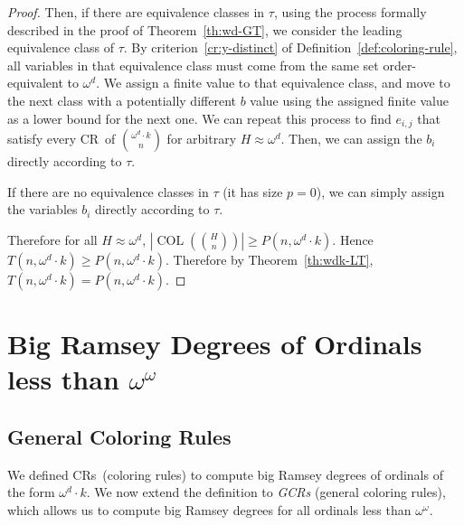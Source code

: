 \documentclass[10pt,a4paper]{article}
\newcommand{\om}{\omega}
\newcommand{\oequiv}{\approx}
\newcommand{\COL}{\operatorname{COL}}
\newcommand{\crulenospace}{CR}
\newcommand{\crulesLong}{coloring rules}
\newcommand{\crule}{\crulenospace~}
\newcommand{\crules}{\crulenospace s~}
\newcommand{\capgencrules}{General Coloring Rules}
\newcommand{\gencrulenospace}{GCR}
\newcommand{\gencrulesLong}{general coloring rules}
\newcommand{\gencrulesnospace}{\gencrulenospace s}
\newcommand{\numpoints}{n}
\newcommand{\inumpoints}{i}
\newcommand{\idegr}{j}
\newcommand{\rareconst}{b}
\theoremstyle{plain}
\theoremstyle{definition}
\begin{document}
\begin{proof}
Then, if there are equivalence classes in $\tau$, using the process formally described in the proof of Theorem~\ref{th:wd-GT},
we consider the leading equivalence class of $\tau$. By criterion~\ref{cr:y-distinct} 
of Definition~\ref{def:coloring-rule}, all variables in that equivalence class 
must come from the same set order-equivalent to $\om^d$. We assign a finite value to 
that equivalence class, and move to the next class
with a potentially different $\rareconst$ value
using the assigned finite value as a lower bound for the next one. We can repeat this process to find $e_{\inumpoints,\idegr}$ that satisfy every \crule of $\binom{\om^d \cdot k}{\numpoints}$ for arbitrary $H \oequiv \om^{d}$. Then, we can assign the $\rareconst_{\inumpoints}$ directly according to $\tau$.

If there are no equivalence classes in $\tau$ (it has size $p=0$), we can simply assign the variables $\rareconst_{\inumpoints}$ directly according to $\tau$.

Therefore for all $H \oequiv \omega^d$,
$\left|\COL\left(\binom{H}{\numpoints}\right)\right|\geq P(\numpoints,\om^d\cdot k)$. Hence $T(\numpoints,\om^d\cdot k) \geq P\left(\numpoints, \om^d\cdot k\right)$. Therefore by Theorem~\ref{th:wdk-LT}, $T(\numpoints,\om^d \cdot k) = P(\numpoints,\om^d \cdot k)$.
\end{proof}

\section{Big Ramsey Degrees of Ordinals less than \texorpdfstring{$\om^\om$}{omega omega}}\label{se:done}

\subsection{\capgencrules}
We defined \crules (\crulesLong) to compute big Ramsey degrees of ordinals of the form $\om^d \cdot k$. We
now extend the definition to \textit{\gencrulesnospace} (\gencrulesLong), which allows us to compute big Ramsey degrees for all ordinals less than $\om^\om$.
\end{document}
